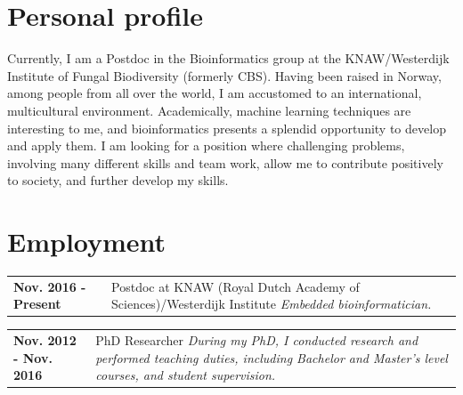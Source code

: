 \documentclass[letterpaper, 10pt]{article} %
\newcommand{\nsection}[1]{
    \section*{\color{MidnightBlue}#1}
  \vspace{-1mm}
}
\newcommand{\entry}[3]{
  \noindent
  \begin{tabular}[t]{p{0.2\textwidth}|p{0.8\textwidth}}
    \textbf{\color{BrickRed}#1} & {#2 \textit{#3}} \\
  \end{tabular}
  \vspace{-2mm}
}
\begin{document}

\nsection{Personal profile}
  \label{sec:persprof}

  Currently, I am a Postdoc in the Bioinformatics group at the KNAW/Westerdijk Institute of Fungal Biodiversity (formerly CBS).
  Having been raised in Norway, among people from all over the world, I am accustomed to an international, multicultural environment.
  Academically, machine learning techniques are interesting to me, and bioinformatics presents a splendid opportunity to develop and apply them.
  I am looking for a position where challenging problems, involving many different skills and team work, allow me to contribute positively to society, and further develop my skills.
  
  

\nsection{Employment}
	\label{sec:employment}
	
	\entry{Nov. 2016 - \newline Present}
	      {Postdoc at KNAW (Royal Dutch Academy of Sciences)/Westerdijk Institute \newline}
	      {Embedded bioinformatician. \newline}
	\entry{Nov. 2012 - \newline Nov. 2016}
	      {PhD Researcher \newline}
	      {During my PhD, I conducted research and performed teaching duties, including Bachelor and Master's level courses, and student supervision.}



\end{document}
